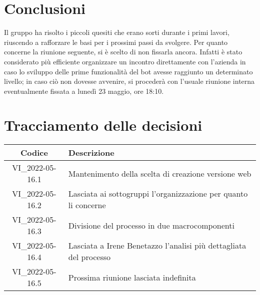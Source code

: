 \section{Conclusioni}
Il gruppo ha risolto i piccoli quesiti che erano sorti durante i primi lavori, riuscendo a rafforzare le
basi per i prossimi passi da svolgere.
\newline
Per quanto concerne la riunione seguente, si è scelto di non fissarla ancora. Infatti è stato considerato più 
efficiente organizzare un incontro direttamente con l'azienda in caso lo sviluppo delle prime funzionalità del 
bot avesse raggiunto un determinato livello; in caso ciò non dovesse avvenire, si procederà con l'usuale riunione 
interna eventualmente fissata a lunedì 23 maggio, ore 18:10.
\newpage

\section*{Tracciamento delle decisioni}
	\renewcommand{\arraystretch}{1.8} %
	\begin{tabular}{ |c|l| }
		\hline
		\textbf{Codice} & \textbf{Descrizione} \\
		\hline
		VI\_2022-05-16.1 & Mantenimento della scelta di creazione versione web\\ %
		\hline
		VI\_2022-05-16.2 & Lasciata ai sottogruppi l'organizzazione per quanto li concerne\\ %
		\hline
		VI\_2022-05-16.3 & Divisione del processo in due macrocomponenti\\ %
		\hline
		VI\_2022-05-16.4 & Lasciata a Irene Benetazzo l'analisi più dettagliata del processo\\ %
		\hline
		VI\_2022-05-16.5 & Prossima riunione lasciata indefinita\\ %
		\hline
	\end{tabular}
